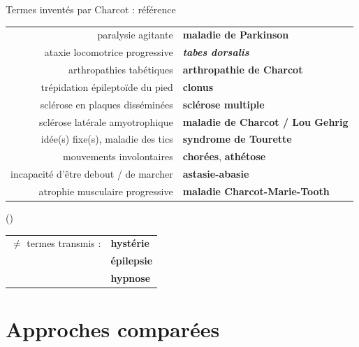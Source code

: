 \documentclass[xcolor={table,usenames,dvipsnames}]{beamer}
\newcommand{\bolder}[1]{{\color{purple}\bfseries#1}}
\begin{document}
\begin{frame}{Termes inventés par Charcot : référence}
	\begin{tabular}{rl}
		paralysie agitante & \bolder{maladie de Parkinson}\\
		ataxie locomotrice progressive & \bolder{\textit{tabes dorsalis}}\\
		arthropathies tabétiques & \bolder{arthropathie de Charcot}\\
		trépidation épileptoïde du pied  & \bolder{clonus}\\
		sclérose en plaques disséminées & \bolder{sclérose multiple}\\
		sclérose latérale amyotrophique & \bolder{maladie de Charcot / Lou Gehrig}\\
		idée(s) fixe(s), maladie des tics &  \bolder{syndrome de Tourette}\\
		mouvements involontaires  & 	\bolder{chorées}, \bolder{athétose}\\
		incapacité d'être debout / de marcher & \bolder{astasie-abasie}\\
		atrophie musculaire progressive & \bolder{maladie Charcot-Marie-Tooth}
	\end{tabular}
	\begin{flushright}
		\scriptsize
		(\citealp{walusinski,camargo2023})
	\end{flushright}
	\medskip
	\begin{flushright}
		\small
			\begin{tabular}{ll}
			$\neq$ termes transmis : & \textcolor{deepblue}{\textbf{hystérie}}\\ & \textcolor{deepblue}{\textbf{épilepsie}} \\ & \textcolor{deepblue}{\textbf{hypnose}}\\
		\end{tabular}

	\end{flushright}


\end{frame}

\section[Approches comparées]{Approches comparées}
\end{document}
